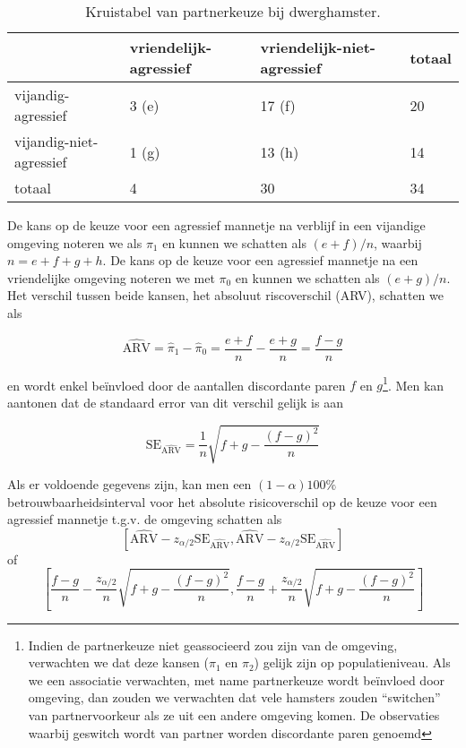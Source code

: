 \documentclass[12pt,dutch,coursenotes]{book}
\let\rmarkdownfootnote\footnote%
\def\footnote{\protect\rmarkdownfootnote}
\theoremstyle{definition}
\theoremstyle{definition}
\theoremstyle{definition}
\theoremstyle{remark}
\begin{document}
\begin{table}

\caption{\label{tab:catHamster}Kruistabel van partnerkeuze bij dwerghamster.}
\centering
\begin{tabular}[t]{llll}
\toprule
  & vriendelijk-agressief & vriendelijk-niet-agressief & totaal\\
\midrule
vijandig-agressief & 3 (e) & 17 (f) & 20\\
vijandig-niet-agressief & 1 (g) & 13 (h) & 14\\
totaal & 4 & 30 & 34\\
\bottomrule
\end{tabular}
\end{table}

De kans op de keuze voor een agressief mannetje na verblijf in een
vijandige omgeving noteren we als \(\pi_1\) en kunnen we schatten als
\((e+f)/n\), waarbij \(n=e+f+g+h\). De kans op de keuze voor een
agressief mannetje na een vriendelijke omgeving noteren we met \(\pi_0\)
en kunnen we schatten als \((e+g)/n\). Het verschil tussen beide kansen,
het absoluut riscoverschil (ARV), schatten we als

\begin{equation*}
\widehat{\text{ARV}}=\hat\pi_1-\hat\pi_0=\frac{e+f}{n}-\frac{e+g}{n}=\frac{f-g}{n}
\end{equation*}

en wordt enkel beïnvloed door de aantallen discordante paren \(f\) en
\(g\)\footnote{Indien de partnerkeuze niet geassocieerd zou zijn van de
  omgeving, verwachten we dat deze kansen (\(\pi_1\) en \(\pi_2\))
  gelijk zijn op populatieniveau. Als we een associatie verwachten, met
  name partnerkeuze wordt beïnvloed door omgeving, dan zouden we
  verwachten dat vele hamsters zouden ``switchen'' van partnervoorkeur
  als ze uit een andere omgeving komen. De observaties waarbij geswitch
  wordt van partner worden discordante paren genoemd}. Men kan aantonen
dat de standaard error van dit verschil gelijk is aan

\begin{equation*}
\text{SE}_{\widehat{\text{ARV}}}=\frac{1}{n}\sqrt{f+g-\frac{(f-g)^2}{n}}
\end{equation*}

Als er voldoende gegevens zijn, kan men een \((1-\alpha)100\%\)
betrouwbaarheidsinterval voor het absolute risicoverschil op de keuze
voor een agressief mannetje t.g.v. de omgeving schatten als
\[\left[\widehat{\text{ARV}}-z_{\alpha/2}\text{SE}_{\widehat{\text{ARV}}},\widehat{\text{ARV}}-z_{\alpha/2}\text{SE}_{\widehat{\text{ARV}}}\right]\]
of
\[\left[\frac{f-g}{n}-\frac{z_{\alpha/2}}{n}\sqrt{f+g-\frac{(f-g)^2}{n}},\frac{f-g}{n}+\frac{z_{\alpha/2}}{n}\sqrt{f+g-\frac{(f-g)^2}{n}}\right] \]
\end{document}
